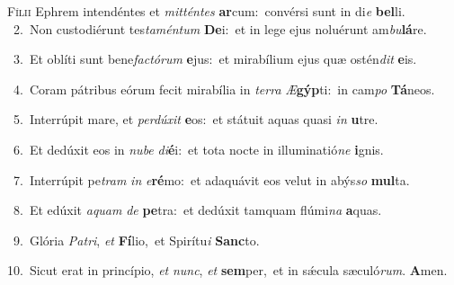 \lettrine{\initial\textcolor{\initialcolor}{F}}{ílii} Ephrem intendéntes et \textit{mit}\-\textit{tén}\textit{tes} \textbf{ar}\-cum:~\star convérsi sunt in di\textit{e} \textbf{bel}\-li.\\
{\numbfont\textcolor{\numbcolor}{~2.}}~Non custodiérunt tes\-\textit{ta}\-\textit{mén}\textit{tum} \textbf{De}\-i:~\star et in lege ejus noluérunt am\-\textit{bu}\-\textbf{lá}re.\par
{\numbfont\textcolor{\numbcolor}{~3.}}~Et oblíti sunt bene\-\textit{fac}\-\textit{tó}\textit{rum} \textbf{e}\-jus:~\star et mirabílium ejus quæ ostén\textit{dit} \textbf{e}\-is.\par
{\numbfont\textcolor{\numbcolor}{~4.}}~Coram pátribus eórum fecit mirabília in \textit{ter}\-\textit{ra} \textit{Æ}\-\textbf{gýp}ti:~\star in cam\textit{po} \textbf{Tá}\-neos.\par
{\numbfont\textcolor{\numbcolor}{~5.}}~Interrúpit mare, et \textit{per}\-\textit{dú}\textit{xit} \textbf{e}\-os:~\star et státuit aquas quasi \textit{in} \textbf{u}\-tre.\par
{\numbfont\textcolor{\numbcolor}{~6.}}~Et dedúxit eos in \textit{nu}\-\textit{be} \textit{di}\-\textbf{é}i:~\star et tota nocte in illuminatió\textit{ne} \textbf{i}\-gnis.\par
{\numbfont\textcolor{\numbcolor}{~7.}}~Interrúpit pe\textit{tram} \textit{in} \textit{e}\-\textbf{ré}mo:~\star et adaquávit eos velut in abýs\textit{so} \textbf{mul}\-ta.\par
{\numbfont\textcolor{\numbcolor}{~8.}}~Et edúxit \textit{a}\-\textit{quam} \textit{de} \textbf{pe}\-tra:~\star et dedúxit tamquam flúmi\textit{na} \textbf{a}\-quas.\par
{\numbfont\textcolor{\numbcolor}{~9.}}~Glória \textit{Pa}\-\textit{tri}, \textit{et} \textbf{Fí}\-lio,~\star et Spirítu\textit{i} \textbf{Sanc}\-to.\par
{\numbfont\textcolor{\numbcolor}{10.}}~Sicut erat in princípio, \textit{et} \textit{nunc}\-, \textit{et} \textbf{sem}\-per,~\star et in sǽcula sæculó\-\textit{rum}\-. \textbf{A}\-men.\par

